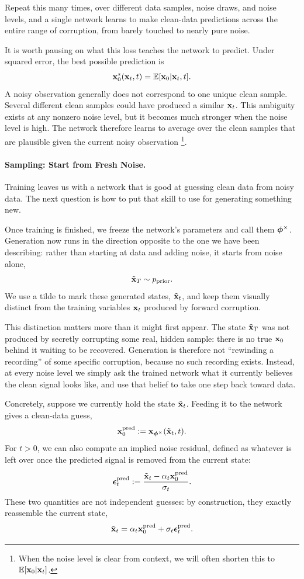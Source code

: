 Repeat this many times, over different data samples, noise draws, and
noise levels, and a single network learns to make clean-data predictions
across the entire range of corruption, from barely touched to nearly
pure noise.

It is worth pausing on what this loss teaches the network to predict.
Under squared error, the best possible prediction is
\[
{\mathbf{x}}_0^*({\mathbf{x}}_t,t)
=
\mathbb{E}[{\mathbf{x}}_0|{\mathbf{x}}_t,t].
\]
A noisy observation generally does not correspond to one unique clean sample.
Several different clean samples could have produced a similar ${\mathbf{x}}_t$.
This ambiguity exists at any nonzero noise level, but it becomes much stronger
when the noise level is high. The network therefore learns to average over
the clean samples that are plausible given the current noisy observation
\footnote{When the noise level is clear from context, we will often shorten
this to $\mathbb{E}[{\mathbf{x}}_0|{\mathbf{x}}_t]$.}.

\paragraph{Sampling: Start from Fresh Noise.}

Training leaves us with a network that is good at guessing clean data
from noisy data. The next question is how to put that skill to use for
generating something new.

Once training is finished, we freeze the network's parameters and call
them ${\bm{\phi}}^\times$. Generation now runs in the direction opposite to the
one we have been describing: rather than starting at data and adding
noise, it starts from noise alone,
\[
\tilde{{\mathbf{x}}}_T\sim p_{\mathrm{prior}}.
\]
We use a tilde to mark these generated states, $\tilde{{\mathbf{x}}}_t$, and keep
them visually distinct from the training variables ${\mathbf{x}}_t$ produced by
forward corruption.

This distinction matters more than it might first appear. The state
$\tilde{{\mathbf{x}}}_T$ was not produced by secretly corrupting some real,
hidden sample: there is no true ${\mathbf{x}}_0$ behind it waiting to be
recovered. Generation is therefore not ``rewinding a recording'' of some
specific corruption, because no such recording exists. Instead, at every
noise level we simply ask the trained network what it currently believes
the clean signal looks like, and use that belief to take one step back
toward data.

Concretely, suppose we currently hold the state $\tilde{{\mathbf{x}}}_t$. Feeding
it to the network gives a clean-data guess,
\[
{\mathbf{x}}_0^{\mathrm{pred}}
:=
{\mathbf{x}}_{{\bm{\phi}}^\times}(\tilde{{\mathbf{x}}}_t,t).
\]
For $t>0$, we can also compute an implied noise residual, defined as
whatever is left over once the predicted signal is removed from the
current state:
\[
{\bm{\epsilon}}_t^{\mathrm{pred}}
:=
\frac{
\tilde{{\mathbf{x}}}_t-\alpha_t{\mathbf{x}}_0^{\mathrm{pred}}
}{
\sigma_t
}.
\]
These two quantities are not independent guesses: by construction, they
exactly reassemble the current state,
\[
\tilde{{\mathbf{x}}}_t
=
\alpha_t{\mathbf{x}}_0^{\mathrm{pred}}
+
\sigma_t{\bm{\epsilon}}_t^{\mathrm{pred}}.
\]

